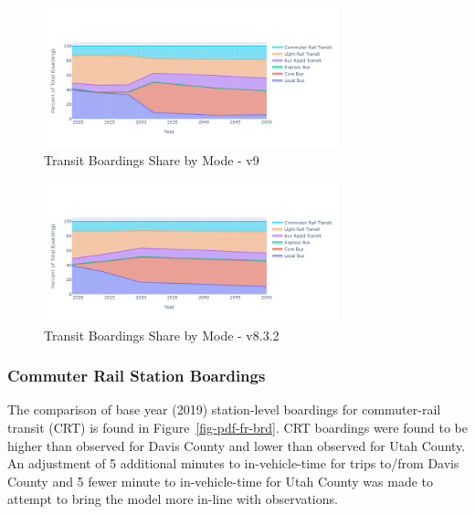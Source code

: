 \documentclass[
  letterpaper,
  DIV=11,
  numbers=noendperiod]{scrreprt}
\begin{document}
\begin{figure}[H]

{\centering \includegraphics[width=0.76\textwidth,height=\textheight]{v9x/v900/whats-new/_pictures/pdf-brd-9.png}

}

\caption{\label{fig-pdf-brd-9}Transit Boardings Share by Mode - v9}

\end{figure}

\begin{figure}[H]

{\centering \includegraphics[width=0.76\textwidth,height=\textheight]{v9x/v900/whats-new/_pictures/pdf-brd-832.png}

}

\caption{\label{fig-pdf-brd-832}Transit Boardings Share by Mode -
v8.3.2}

\end{figure}

\hypertarget{commuter-rail-station-boardings}{%
\subsubsection{Commuter Rail Station
Boardings}\label{commuter-rail-station-boardings}}

The comparison of base year (2019) station-level boardings for
commuter-rail transit (CRT) is found in Figure~\ref{fig-pdf-fr-brd}. CRT
boardings were found to be higher than observed for Davis County and
lower than observed for Utah County. An adjustment of 5 additional
minutes to in-vehicle-time for trips to/from Davis County and 5 fewer
minute to in-vehicle-time for Utah County was made to attempt to bring
the model more in-line with observations.
\end{document}

